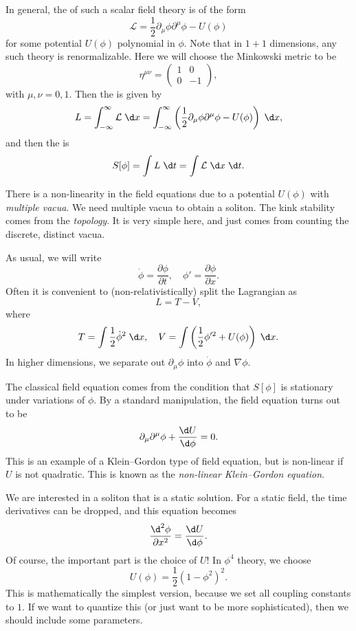 \documentclass[a4paper]{article}
\begin{document}
In general, the  of such a scalar field theory is of the form
\[
  \mathcal{L} = \frac{1}{2} \partial_\mu \phi \partial^\mu \phi - U(\phi)
\]
for some potential $U(\phi)$ polynomial in $\phi$. Note that in $1 + 1$ dimensions, any such theory is renormalizable. Here we will choose the Minkowski metric to be
\[
  \eta^{\mu\nu} =
  \begin{pmatrix}
    1 & 0\\
    0 & -1
  \end{pmatrix},
\]
with $\mu, \nu = 0, 1$. Then the  is given by
\[
  L = \int_{-\infty}^\infty \mathcal{L}\;\d x = \int_{-\infty}^\infty \left(\frac{1}{2} \partial_\mu \phi \partial^\mu \phi - U(\phi)\right)\;\d x,
\]
and then the  is
\[
  S[\phi] = \int L\;\d t = \int \mathcal{L} \;\d x\;\d t.
\]

There is a non-linearity in the field equations due to a potential $U(\phi)$ with \emph{multiple vacua}. We need multiple vacua to obtain a soliton. The kink stability comes from the \emph{topology}. It is very simple here, and just comes from counting the discrete, distinct vacua.

As usual, we will write
\[
  \dot{\phi} = \frac{\partial \phi}{\partial t},\quad \phi' = \frac{\partial \phi}{\partial x}.
\]
Often it is convenient to (non-relativistically) split the Lagrangian as
\[
  L = T - V,
\]
where
\[
  T = \int \frac{1}{2} \dot{\phi}^2\;\d x,\quad V = \int \left(\frac{1}{2} \phi'^2 + U(\phi)\right)\;\d x.
\]
In higher dimensions, we separate out $\partial_\mu \phi$ into $\dot{\phi}$ and $\nabla \phi$.

The classical field equation comes from the condition that $S[\phi]$ is stationary under variations of $\phi$. By a standard manipulation, the field equation turns out to be
\[
  \partial_\mu \partial^\mu \phi + \frac{\d U}{\d \phi} = 0.
\]
This is an example of a Klein--Gordon type of field equation, but is non-linear if $U$ is not quadratic. This is known as the \emph{non-linear Klein--Gordon equation}.

We are interested in a soliton that is a static solution. For a static field, the time derivatives can be dropped, and this equation becomes
\[
  \frac{\d^2 \phi}{\partial x^2} = \frac{\d U}{\d \phi}.
\]
Of course, the important part is the choice of $U$! In $\phi^4$ theory, we choose
\[
  U(\phi) = \frac{1}{2} (1 - \phi^2)^2.
\]
This is mathematically the simplest version, because we set all coupling constants to $1$. If we want to quantize this (or just want to be more sophisticated), then we should include some parameters.
\end{document}
